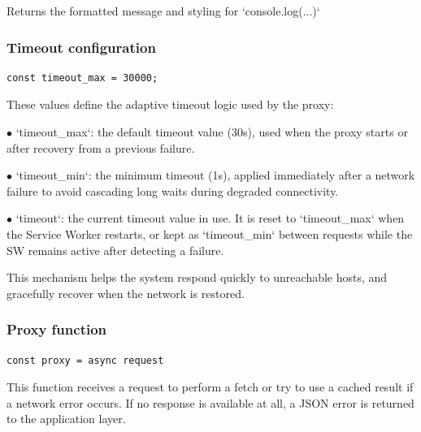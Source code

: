 \documentclass[a4paper]{article}
\begin{document}
Returns the formatted message and styling for `console.log(...)`

\hypertarget{toc265}{}
\subsubsection{Timeout configuration}

\begin{lstlisting}
const timeout_max = 30000;
\end{lstlisting}

These values define the adaptive timeout logic used by the proxy:

\begin{compactitem}
\item[\color{myblue}$\bullet$] `timeout\_max`: the default timeout value (30s), used when the proxy starts
  or after recovery from a previous failure.
\end{compactitem}

\begin{compactitem}
\item[\color{myblue}$\bullet$] `timeout\_min`: the minimum timeout (1s), applied immediately after a network
  failure to avoid cascading long waits during degraded connectivity.
\end{compactitem}

\begin{compactitem}
\item[\color{myblue}$\bullet$] `timeout`: the current timeout value in use. It is reset to `timeout\_max`
  when the Service Worker restarts, or kept as `timeout\_min` between requests
  while the SW remains active after detecting a failure.
\end{compactitem}

This mechanism helps the system respond quickly to unreachable hosts,
and gracefully recover when the network is restored.

\hypertarget{toc266}{}
\subsubsection{Proxy function}

\begin{lstlisting}
const proxy = async request
\end{lstlisting}

This function receives a request to perform a fetch or try to use a cached
result if a network error occurs. If no response is available at all,
a JSON error is returned to the application layer.
\end{document}
